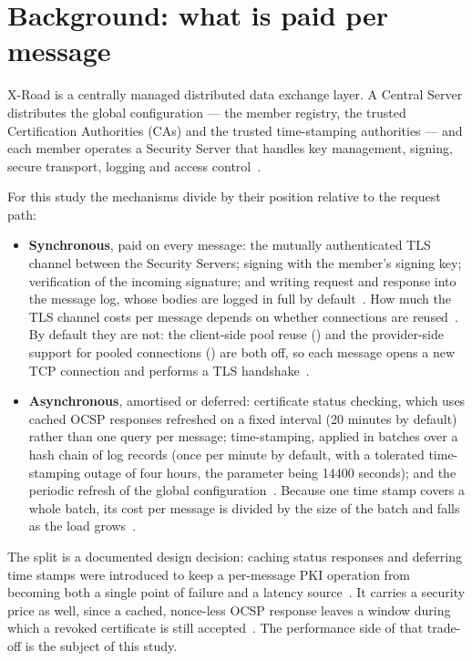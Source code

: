 \documentclass[conference,a4paper]{IEEEtran}
\begin{document}
\section{Background: what is paid per message}

X-Road is a centrally managed distributed data exchange layer. A Central Server distributes the
global configuration --- the member registry, the trusted Certification Authorities (CAs) and the
trusted time-stamping authorities --- and each member operates a Security Server that handles key
management, signing, secure transport, logging and access control~\cite{bakhtina2023ares,
xroadarcss}.

For this study the mechanisms divide by their position relative to the request path:

\begin{itemize}
  \item \textbf{Synchronous}, paid on every message: the mutually authenticated TLS channel between
  the Security Servers; signing with the member's signing key; verification of the incoming
  signature; and writing request and response into the message log, whose bodies are logged in full
  by default~\cite{xroadsyspar}. How much the TLS channel costs per message depends on whether
  connections are reused~\cite{naylor2014}. By default they are not: the client-side pool reuse
  () and the provider-side support for pooled connections
  () are both off, so each message opens a new
  TCP connection and performs a TLS handshake~\cite{xroadsyspar}.
  \item \textbf{Asynchronous}, amortised or deferred: certificate status checking, which uses cached
  OCSP responses refreshed on a fixed interval (20 minutes by default) rather than one query per
  message; time-stamping, applied in batches over a hash chain of log records (once per minute by
  default, with a tolerated time-stamping outage of four hours, the parameter
   being 14400 seconds); and the periodic refresh of the
  global configuration~\cite{kivimaki2020,xroadsyspar,ansper2013}. Because one time stamp covers a
  whole batch, its cost per message is divided by the size of the batch and falls as the load
  grows~\cite{xroadarcss,ansper2013}.
\end{itemize}

The split is a documented design decision: caching status responses and deferring time stamps were
introduced to keep a per-message PKI operation from becoming both a single point of failure and a
latency source~\cite{ansper2013}. It carries a security price as well, since a cached, nonce-less
OCSP response leaves a window during which a revoked certificate is still
accepted~\cite{bakhtina2023ares}. The performance side of that trade-off is the subject of this study.
\end{document}
